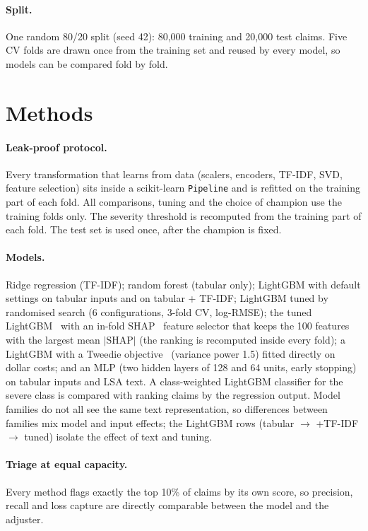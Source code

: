 \documentclass[10pt,twocolumn,letterpaper]{article}
\begin{document}
\paragraph{Split.} One random 80/20 split (seed 42): 80,000 training and 20,000 test claims. Five CV folds are drawn once
from the training set and reused by every model, so models can be compared fold by fold.

\section{Methods}
\paragraph{Leak-proof protocol.} Every transformation that learns from data (scalers, encoders, TF-IDF, SVD, feature
selection) sits inside a scikit-learn \texttt{Pipeline} and is refitted on the training part of each fold. All
comparisons, tuning and the choice of champion use the training folds only. The severity threshold is recomputed from
the training part of each fold. The test set is used once, after the champion is fixed.

\paragraph{Models.} Ridge regression (TF-IDF); random forest (tabular only); LightGBM with default settings on tabular
inputs and on tabular + TF-IDF; LightGBM tuned by randomised search (6 configurations, 3-fold CV, log-RMSE); the tuned
LightGBM~\cite{ke2017lightgbm} with an in-fold SHAP~\cite{lundberg2017shap} feature selector that keeps the 100 features with the largest mean $|\text{SHAP}|$ (the
ranking is recomputed inside every fold); a LightGBM with a Tweedie objective~\cite{jorgensen} (variance power 1.5) fitted directly on dollar
costs; and an MLP (two hidden layers of 128 and 64 units, early stopping) on tabular inputs and LSA text. A class-weighted
LightGBM classifier for the severe class is compared with ranking claims by the regression output. Model families do not
all see the same text representation, so differences between families mix model and input effects; the LightGBM rows
(tabular $\rightarrow$ +TF-IDF $\rightarrow$ tuned) isolate the effect of text and tuning.

\paragraph{Triage at equal capacity.} Every method flags exactly the top 10\% of claims by its own score, so precision,
recall and loss capture are directly comparable between the model and the adjuster.
\end{document}
